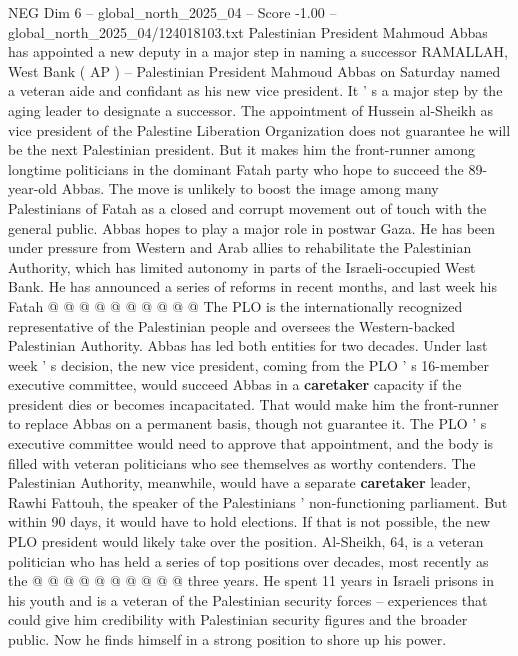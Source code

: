 \begin{textsample}{NEG Dim 6 – global\_north\_2025\_04 – Score -1.00 – global\_north\_2025\_04/124018103.txt}  \label{ex:f6_neg_237}
Palestinian President Mahmoud Abbas has appointed a new deputy in a major step in naming a successor RAMALLAH, West Bank ( AP ) -- Palestinian President Mahmoud Abbas on Saturday named a veteran aide and confidant as his new vice president.
It ' s a major step by the aging leader to designate a successor.
The appointment of Hussein al-Sheikh as vice president of the Palestine Liberation Organization does not guarantee he will be the next Palestinian president.
But it makes him the front-runner among longtime politicians in the dominant Fatah party who hope to succeed the 89-year-old Abbas.
The move is unlikely to boost the image among many Palestinians of Fatah as a closed and corrupt movement out of touch with the general public.
Abbas hopes to play a major role in postwar Gaza.
He has been under pressure from Western and Arab allies to rehabilitate the Palestinian Authority, which has limited autonomy in parts of the Israeli-occupied West Bank.
He has announced a series of reforms in recent months, and last week his Fatah @ @ @ @ @ @ @ @ @ @ The PLO is the internationally recognized representative of the Palestinian people and oversees the Western-backed Palestinian Authority.
Abbas has led both entities for two decades.
Under last week ' s decision, the new vice president, coming from the PLO ' s 16-member executive committee, would succeed Abbas in a \textbf{caretaker} capacity if the president dies or becomes incapacitated.
That would make him the front-runner to replace Abbas on a permanent basis, though not guarantee it.
The PLO ' s executive committee would need to approve that appointment, and the body is filled with veteran politicians who see themselves as worthy contenders.
The Palestinian Authority, meanwhile, would have a separate \textbf{caretaker} leader, Rawhi Fattouh, the speaker of the Palestinians ' non-functioning parliament.
But within 90 days, it would have to hold elections.
If that is not possible, the new PLO president would likely take over the position.
Al-Sheikh, 64, is a veteran politician who has held a series of top positions over decades, most recently as the @ @ @ @ @ @ @ @ @ @ three years.
He spent 11 years in Israeli prisons in his youth and is a veteran of the Palestinian security forces -- experiences that could give him credibility with Palestinian security figures and the broader public.
Now he finds himself in a strong position to shore up his power.

\end{textsample}
